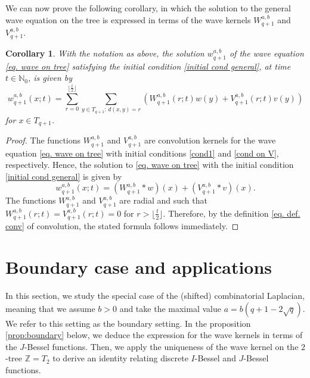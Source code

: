 \documentclass[12pt]{amsart}
\numberwithin{equation}{section}
\newtheorem{corollary}[theorem]{Corollary}
\theoremstyle{boldremark}
\begin{document}
We can now prove the following corollary, in which the solution to the general wave equation on the tree is expressed in terms of the wave kernels $W_{q+1}^{a,b}$ and $V_{q+1}^{a,b}$.

\begin{corollary}
  With the notation as above, the solution $w_{q+1}^{a,b}$ of the wave equation \eqref{eq. wave on tree} satisfying the initial condition \eqref{initial cond general}, at time $t\in\mathbb N_0$, is given by
$$
w_{q+1}^{a,b}(x;t)=\sum_{r=0}^{\lfloor\frac{t}{2}\rfloor}\sum_{y\in T_{q+1}:\, d(x,y)=r}\left(W_{q+1}^{a,b}(r;t)w(y) + V_{q+1}^{a,b}(r;t)v(y)\right)
$$
for $x\in T_{q+1}$.
\end{corollary}
\begin{proof}
The functions $W_{q+1}^{a,b}$ and $V_{q+1}^{a,b}$ are convolution kernels for the wave equation \eqref{eq. wave on tree} with initial conditions \eqref{cond1} and \eqref{cond on V}, respectively. Hence, the solution to \eqref{eq. wave on tree} with the initial condition \eqref{initial cond general} is given by
$$
w_{q+1}^{a,b}(x;t)=(W_{q+1}^{a,b}\ast w )(x) +(V_{q+1}^{a,b}\ast v )(x). 
$$
The functions $W_{q+1}^{a,b}$ and $V_{q+1}^{a,b}$ are radial and such that $W_{q+1}^{a,b}(r;t)=V_{q+1}^{a,b}(r;t)=0$ for $r>\lfloor\frac{t}{2}\rfloor$. Therefore, by the definition \eqref{eq. def. conv} of convolution, the stated formula follows immediately. 
\end{proof}

\section{Boundary case and applications}\label{sec. applic on tree}

In this section, we study the special case of the (shifted) combinatorial Laplacian, meaning that we assume $b>0$ and take the maximal value $a=b(q+1-2\sqrt{q})$. We refer to this setting as the boundary setting. In the proposition \ref{prop:boundary} below, we deduce the expression for the wave kernels in terms of the $J$-Bessel functions.
Then, we apply the uniqueness of the wave kernel on the $2$-tree $\mathbb{Z}=T_2$ to derive an identity relating discrete $I$-Bessel and $J$-Bessel functions.
\end{document}
